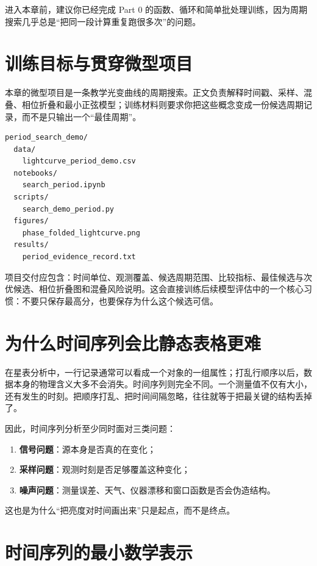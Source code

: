 进入本章前，建议你已经完成 Part 0 的函数、循环和简单批处理训练，因为周期搜索几乎总是“把同一段计算重复跑很多次”的问题。

\section{训练目标与贯穿微型项目}

本章的微型项目是一条教学光变曲线的周期搜索。正文负责解释时间戳、采样、混叠、相位折叠和最小正弦模型；训练材料则要求你把这些概念变成一份候选周期记录，而不是只输出一个“最佳周期”。

\begin{examplebox}[最小周期搜索项目结构]
\begin{lstlisting}[style=terminal]
period_search_demo/
  data/
    lightcurve_period_demo.csv
  notebooks/
    search_period.ipynb
  scripts/
    search_demo_period.py
  figures/
    phase_folded_lightcurve.png
  results/
    period_evidence_record.txt
\end{lstlisting}
\end{examplebox}

项目交付应包含：时间单位、观测覆盖、候选周期范围、比较指标、最佳候选与次优候选、相位折叠图和混叠风险说明。这会直接训练后续模型评估中的一个核心习惯：不要只保存最高分，也要保存为什么这个候选可信。

\section{为什么时间序列会比静态表格更难}

在星表分析中，一行记录通常可以看成一个对象的一组属性；打乱行顺序以后，数据本身的物理含义大多不会消失。时间序列则完全不同。一个测量值不仅有大小，还有发生的时刻。把顺序打乱、把时间间隔忽略，往往就等于把最关键的结构丢掉了。

因此，时间序列分析至少同时面对三类问题：

\begin{enumerate}
    \item \textbf{信号问题}：源本身是否真的在变化；
    \item \textbf{采样问题}：观测时刻是否足够覆盖这种变化；
    \item \textbf{噪声问题}：测量误差、天气、仪器漂移和窗口函数是否会伪造结构。
\end{enumerate}

这也是为什么“把亮度对时间画出来”只是起点，而不是终点。

\section{时间序列的最小数学表示}


